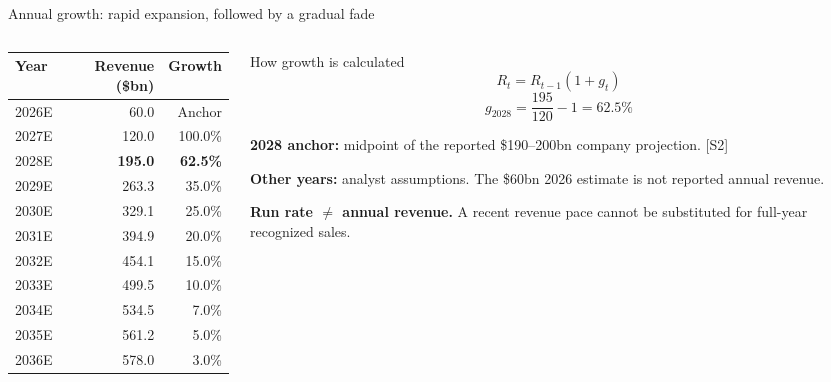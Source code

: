 \documentclass[aspectratio=169,11pt]{beamer}
\begin{document}
\begin{frame}{Annual growth: rapid expansion, followed by a gradual fade}
  \begin{columns}[T,onlytextwidth]
    \begin{column}{0.52\textwidth}
      \small
      \begin{tabular}{@{}lrr@{}}
        \toprule
        Year & Revenue (\$bn) & Growth\\
        \midrule
        2026E & 60.0 & Anchor\\
        2027E & 120.0 & 100.0\%\\
        2028E & \textbf{195.0} & \textbf{62.5\%}\\
        2029E & 263.3 & 35.0\%\\
        2030E & 329.1 & 25.0\%\\
        2031E & 394.9 & 20.0\%\\
        2032E & 454.1 & 15.0\%\\
        2033E & 499.5 & 10.0\%\\
        2034E & 534.5 & 7.0\%\\
        2035E & 561.2 & 5.0\%\\
        2036E & 578.0 & 3.0\%\\
        \bottomrule
      \end{tabular}
    \end{column}
    \begin{column}{0.44\textwidth}
      \begin{block}{How growth is calculated}
        \[
          R_t=R_{t-1}(1+g_t)
        \]
        \[
          g_{2028}=\frac{195}{120}-1=62.5\%
        \]
      \end{block}
      \small
      \textbf{2028 anchor:} midpoint of the reported \$190--200bn company projection. [S2]
      \vspace{0.2cm}

      \textbf{Other years:} analyst assumptions. The \$60bn 2026 estimate is not reported annual revenue.
      \vspace{0.2cm}

      \textbf{Run rate $\ne$ annual revenue.} A recent revenue pace cannot be substituted for full-year recognized sales.
    \end{column}
  \end{columns}
\end{frame}
\end{document}

